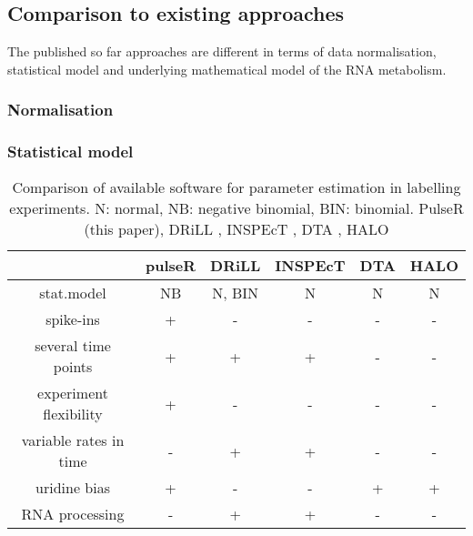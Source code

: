 \subsection{Comparison to existing approaches}
The published so far approaches are different in terms of 
data normalisation, statistical model and underlying mathematical model of the 
RNA metabolism.
\subsubsection*{Normalisation}

\subsubsection*{Statistical model}

\begin{table}
 \begin{tabular}{|c|c|c|c|c|c|}\hline
                        &pulseR &DRiLL          &INSPEcT&DTA    &HALO       \\\hline
 stat.model             & NB    &N, BIN         &N       & N     &N      \\\hline                         
 spike-ins              & +     &   -           &  -     &  -    & -         \\\hline               
 several time points    & +     &    +          &  +     &  -    & -         \\\hline                    
 experiment flexibility & +     &   -           &  -     &  -    & -         \\\hline 
 variable rates in time &  -    &    +          &  +     &  -    & -         \\\hline 
            uridine bias& +     &   -           &  -     &  +    & +         \\\hline 
       RNA processing   & -     &    +          &  +     &  -    & -         \\\hline 
 \end{tabular}
\caption{Comparison of available software for parameter estimation in 
labelling experiments. N: normal, NB: negative binomial, BIN: binomial.
PulseR (this paper), 
DRiLL \citep{rabani2014high},
INSPEcT \citep{de2015inspect},
DTA \citep{schwalb2012measurement},
HALO \citep{friedel2010halo}
}
\end{table}
